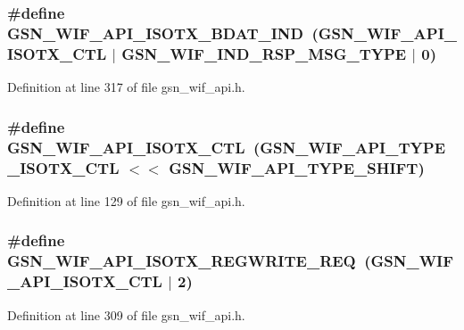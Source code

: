 \hypertarget{a00606_a4d597f3f49ec5c3e0d0cef4ae6c1d206}{
\subsubsection[{GSN\_\-WIF\_\-API\_\-ISOTX\_\-BDAT\_\-IND}]{\setlength{\rightskip}{0pt plus 5cm}\#define GSN\_\-WIF\_\-API\_\-ISOTX\_\-BDAT\_\-IND~(GSN\_\-WIF\_\-API\_\-ISOTX\_\-CTL $|$ GSN\_\-WIF\_\-IND\_\-RSP\_\-MSG\_\-TYPE $|$ 0)}}
\label{a00606_a4d597f3f49ec5c3e0d0cef4ae6c1d206}


Definition at line 317 of file gsn\_\-wif\_\-api.h.

\hypertarget{a00606_a007ca824d2c96585429e34764c16ab18}{
\subsubsection[{GSN\_\-WIF\_\-API\_\-ISOTX\_\-CTL}]{\setlength{\rightskip}{0pt plus 5cm}\#define GSN\_\-WIF\_\-API\_\-ISOTX\_\-CTL~(GSN\_\-WIF\_\-API\_\-TYPE\_\-ISOTX\_\-CTL $<$$<$ GSN\_\-WIF\_\-API\_\-TYPE\_\-SHIFT)}}
\label{a00606_a007ca824d2c96585429e34764c16ab18}


Definition at line 129 of file gsn\_\-wif\_\-api.h.

\hypertarget{a00606_a76d48fe893107985b120f8001db43c86}{
\subsubsection[{GSN\_\-WIF\_\-API\_\-ISOTX\_\-REGWRITE\_\-REQ}]{\setlength{\rightskip}{0pt plus 5cm}\#define GSN\_\-WIF\_\-API\_\-ISOTX\_\-REGWRITE\_\-REQ~(GSN\_\-WIF\_\-API\_\-ISOTX\_\-CTL $|$ 2)}}
\label{a00606_a76d48fe893107985b120f8001db43c86}


Definition at line 309 of file gsn\_\-wif\_\-api.h.


